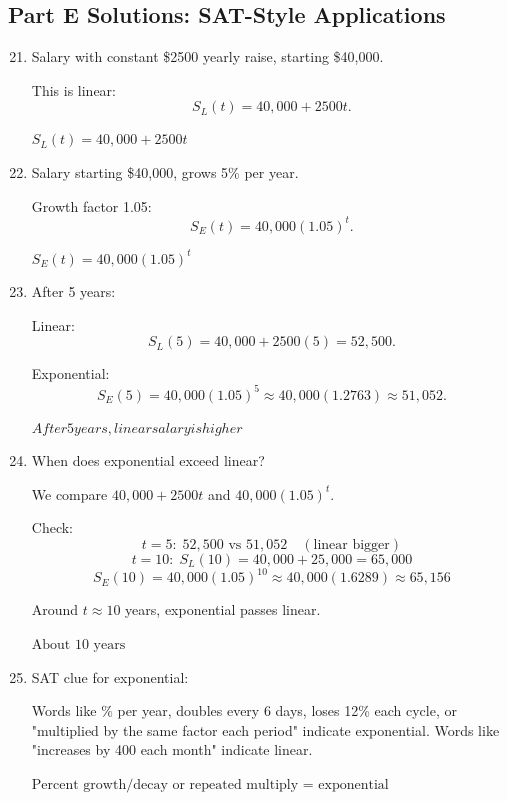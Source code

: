 \documentclass[14pt]{extarticle}
\begin{document}
\subsection*{Part E Solutions: SAT-Style Applications}
\begin{enumerate}
  \setcounter{enumi}{20}
  \item Salary with constant \$2500 yearly raise, starting \$40{,}000.

  This is linear:
  \[
  S_L(t) = 40{,}000 + 2500t.
  \]

  \(\boxed{S_L(t)=40{,}000+2500t}\)

  \item Salary starting \$40{,}000, grows 5\% per year.

  Growth factor 1.05:
  \[
  S_E(t) = 40{,}000(1.05)^t.
  \]

  \(\boxed{S_E(t)=40{,}000(1.05)^t}\)

  \item After 5 years:

  Linear:
  \[
  S_L(5)=40{,}000+2500(5)=52{,}500.
  \]

  Exponential:
  \[
  S_E(5)=40{,}000(1.05)^5 \approx 40{,}000(1.2763)\approx 51{,}052.
  \]

  \(\boxed{After 5 years, linear salary is higher}\)

  \item When does exponential exceed linear?

  We compare \(40{,}000 + 2500t\) and \(40{,}000(1.05)^t\).

  Check:
  \[
  t=5:\; 52{,}500 \text{ vs } 51{,}052 \quad (\text{linear bigger})
  \]
  \[
  t=10:\; S_L(10)=40{,}000+25{,}000=65{,}000
  \]
  \[
  S_E(10)=40{,}000(1.05)^{10}\approx 40{,}000(1.6289)\approx 65{,}156
  \]

  Around \(t \approx 10\) years, exponential passes linear.

  \(\boxed{\text{About 10 years}}\)

  \item SAT clue for exponential:

  Words like \(\%\) per year, doubles every 6 days, loses 12\% each cycle, or "multiplied by the same factor each period" indicate exponential.  
  Words like "increases by 400 each month" indicate linear.

  \(\boxed{\text{Percent growth/decay or repeated multiply = exponential}}\)
\end{enumerate}





\end{document}
